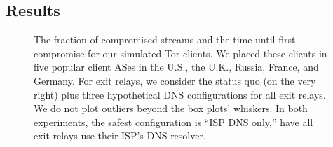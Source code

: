 \subsection{Results}

\begin{figure}[t]
\centering
{}
\caption{The fraction of compromised streams and the time until first compromise
for our simulated Tor clients.  We placed these clients in five popular client
ASes in the U.S., the U.K., Russia, France, and Germany.  For exit relays, we
consider the status quo (on the very right) plus three hypothetical DNS
configurations for all exit relays.  We do not plot outliers beyond the box
plots' whiskers.  In both experiments, the safest configuration is ``ISP DNS
only,'' \ie have all exit relays use their ISP's DNS resolver.}
\end{figure}

